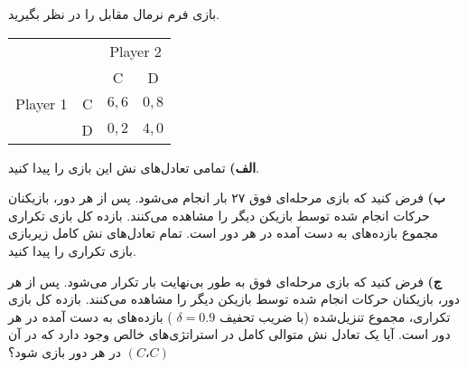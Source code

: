 بازی فرم نرمال مقابل را در نظر بگیرید.

\LTR 
\begin{latin}
    \begin{center}
        \begin{tabular}{r  c | c | c |}
            \multicolumn{2}{r}{} &
            \multicolumn{2}{c}{Player 2} \\
            \multicolumn{1}{r}{} &
            \multicolumn{1}{c}{} &
            \multicolumn{1}{c}{C} &
            \multicolumn{1}{c}{D} \\ \cline{3-4}
            Player 1  & C       & $6,6$     & $0,8$  \\ \cline{3-4}
                      & D       & $0,2$     & $4,0$ \\ \cline{3-4}
        \end{tabular}
    \end{center}
\end{latin}
\RTL

\vspace*{5pt}
\textbf{الف)}
تمامی تعادل‌های نش این بازی را پیدا کنید.

\vspace*{5pt}
\textbf{ب)}
فرض کنید که بازی مرحله‌ای فوق ۲۷ بار انجام می‌شود. پس از هر دور، بازیکنان حرکات انجام شده توسط بازیکن دیگر را مشاهده می‌کنند. بازده کل بازی تکراری مجموع بازده‌های به دست آمده در هر دور است. تمام تعادل‌های نش کامل زیربازی بازی تکراری را پیدا کنید.

\vspace*{5pt}
\textbf{ج)}
فرض کنید که بازی مرحله‌ای فوق به طور بی‌نهایت بار تکرار می‌شود. پس از هر دور، بازیکنان حرکات انجام شده توسط بازیکن دیگر را مشاهده می‌کنند. بازده کل بازی تکراری، مجموع تنزیل‌شده (با ضریب تحفیف
$\delta = 0.9$
) بازده‌های به دست آمده در هر دور است. آیا یک تعادل نش متوالی کامل در استراتژی‌های خالص وجود دارد که در آن
$(C، C)$
در هر دور بازی شود؟